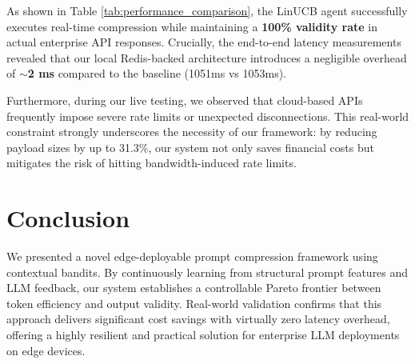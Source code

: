\documentclass{article}
\begin{document}
As shown in Table \ref{tab:performance_comparison}, the LinUCB agent successfully executes real-time compression while maintaining a \textbf{100\% validity rate} in actual enterprise API responses. Crucially, the end-to-end latency measurements revealed that our local Redis-backed architecture introduces a negligible overhead of \textbf{$\sim$2 ms} compared to the baseline (1051ms vs 1053ms).

Furthermore, during our live testing, we observed that cloud-based APIs frequently impose severe rate limits or unexpected disconnections. This real-world constraint strongly underscores the necessity of our framework: by reducing payload sizes by up to 31.3\%, our system not only saves financial costs but mitigates the risk of hitting bandwidth-induced rate limits.

\section{Conclusion}
We presented a novel edge-deployable prompt compression framework using contextual bandits. By continuously learning from structural prompt features and LLM feedback, our system establishes a controllable Pareto frontier between token efficiency and output validity. Real-world validation confirms that this approach delivers significant cost savings with virtually zero latency overhead, offering a highly resilient and practical solution for enterprise LLM deployments on edge devices.

% 
% 
\end{document}
